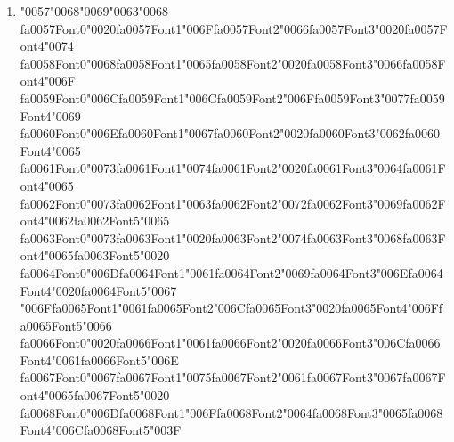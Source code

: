 \documentclass[11pt]{article}
\begin{document}
\begin{enumerate}[leftmargin=*]
    \textbf{A.} A technique that compresses text by replacing consecutive repeated characters with a count and a symbol
    \textbf{B.} A tokenization method that iteratively merges the most frequent pair of symbols in a corpus
    \textbf{C.} A tokenization method that splits text based on whitespace and punctuation
    \textbf{D.} A character-level encoding scheme that assigns fixed-length binary codes to characters

  \item {\char"0057}{\char"0068}{\char"0069}{\char"0063}{\char"0068} {\csname fa0057Font0\endcsname\char"0020}{\csname fa0057Font1\endcsname\char"006F}{\csname fa0057Font2\endcsname\char"0066}{\csname fa0057Font3\endcsname\char"0020}{\csname fa0057Font4\endcsname\char"0074} {\csname fa0058Font0\endcsname\char"0068}{\csname fa0058Font1\endcsname\char"0065}{\csname fa0058Font2\endcsname\char"0020}{\csname fa0058Font3\endcsname\char"0066}{\csname fa0058Font4\endcsname\char"006F} {\csname fa0059Font0\endcsname\char"006C}{\csname fa0059Font1\endcsname\char"006C}{\csname fa0059Font2\endcsname\char"006F}{\csname fa0059Font3\endcsname\char"0077}{\csname fa0059Font4\endcsname\char"0069} {\csname fa0060Font0\endcsname\char"006E}{\csname fa0060Font1\endcsname\char"0067}{\csname fa0060Font2\endcsname\char"0020}{\csname fa0060Font3\endcsname\char"0062}{\csname fa0060Font4\endcsname\char"0065} {\csname fa0061Font0\endcsname\char"0073}{\csname fa0061Font1\endcsname\char"0074}{\csname fa0061Font2\endcsname\char"0020}{\csname fa0061Font3\endcsname\char"0064}{\csname fa0061Font4\endcsname\char"0065} {\csname fa0062Font0\endcsname\char"0073}{\csname fa0062Font1\endcsname\char"0063}{\csname fa0062Font2\endcsname\char"0072}{\csname fa0062Font3\endcsname\char"0069}{\csname fa0062Font4\endcsname\char"0062}{\csname fa0062Font5\endcsname\char"0065} {\csname fa0063Font0\endcsname\char"0073}{\csname fa0063Font1\endcsname\char"0020}{\csname fa0063Font2\endcsname\char"0074}{\csname fa0063Font3\endcsname\char"0068}{\csname fa0063Font4\endcsname\char"0065}{\csname fa0063Font5\endcsname\char"0020} {\csname fa0064Font0\endcsname\char"006D}{\csname fa0064Font1\endcsname\char"0061}{\csname fa0064Font2\endcsname\char"0069}{\csname fa0064Font3\endcsname\char"006E}{\csname fa0064Font4\endcsname\char"0020}{\csname fa0064Font5\endcsname\char"0067} {\char"006F}{\csname fa0065Font1\endcsname\char"0061}{\csname fa0065Font2\endcsname\char"006C}{\csname fa0065Font3\endcsname\char"0020}{\csname fa0065Font4\endcsname\char"006F}{\csname fa0065Font5\endcsname\char"0066} {\csname fa0066Font0\endcsname\char"0020}{\csname fa0066Font1\endcsname\char"0061}{\csname fa0066Font2\endcsname\char"0020}{\csname fa0066Font3\endcsname\char"006C}{\csname fa0066Font4\endcsname\char"0061}{\csname fa0066Font5\endcsname\char"006E} {\csname fa0067Font0\endcsname\char"0067}{\csname fa0067Font1\endcsname\char"0075}{\csname fa0067Font2\endcsname\char"0061}{\csname fa0067Font3\endcsname\char"0067}{\csname fa0067Font4\endcsname\char"0065}{\csname fa0067Font5\endcsname\char"0020} {\csname fa0068Font0\endcsname\char"006D}{\csname fa0068Font1\endcsname\char"006F}{\csname fa0068Font2\endcsname\char"0064}{\csname fa0068Font3\endcsname\char"0065}{\csname fa0068Font4\endcsname\char"006C}{\csname fa0068Font5\endcsname\char"003F}

\end{enumerate}
\end{document}
